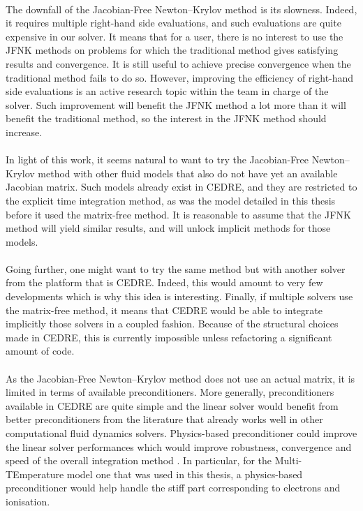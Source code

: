     \paragraph{}
    The downfall of the Jacobian-Free Newton--Krylov method is its slowness.
    Indeed, it requires multiple right-hand side evaluations, and such evaluations are quite expensive in our solver.
    It means that for a user, there is no interest to use the JFNK methods on problems for which the traditional method gives satisfying results and convergence.
    It is still useful to achieve precise convergence when the traditional method fails to do so.
    However, improving the efficiency of right-hand side evaluations is an active research topic within the team in charge of the solver.
    Such improvement will benefit the JFNK method a lot more than it will benefit the traditional method, so the interest in the JFNK method should increase.

    \paragraph{}
    In light of this work, it seems natural to want to try the Jacobian-Free Newton--Krylov method with other fluid models that also do not have yet an available Jacobian matrix.
    Such models already exist in CEDRE, and they are restricted to the explicit time integration method, as was the model detailed in this thesis before it used the matrix-free method.
    It is reasonable to assume that the JFNK method will yield similar results, and will unlock implicit methods for those models.

    \paragraph{}
    Going further, one might want to try the same method but with another solver from the platform that is CEDRE.
    Indeed, this would amount to very few developments which is why this idea is interesting.
    Finally, if multiple solvers use the matrix-free method, it means that CEDRE would be able to integrate implicitly those solvers in a coupled fashion.
    Because of the structural choices made in CEDRE, this is currently impossible unless refactoring a significant amount of code.

    \paragraph{}
    As the Jacobian-Free Newton--Krylov method does not use an actual matrix, it is limited in terms of available preconditioners.
    More generally, preconditioners available in CEDRE are quite simple and the linear solver would benefit from better preconditioners from the literature that already works well in other computational fluid dynamics solvers.
    Physics-based preconditioner could improve the linear solver performances which would improve robustness, convergence and speed of the overall integration method \cite{ParkNourgalievMartineauEtAl2009, LiuZhangZhongEtAl2015}.
    In particular, for the Multi-TEmperature model one that was used in this thesis, a physics-based preconditioner would help handle the stiff part corresponding to electrons and ionisation.


